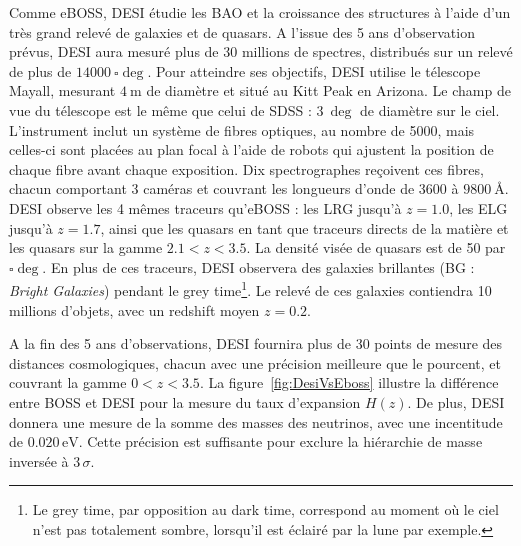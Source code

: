 Comme eBOSS, DESI étudie les BAO et la croissance des structures à l'aide d'un très grand relevé de galaxies et de quasars. A l'issue des 5 ans d'observation prévus, DESI aura mesuré plus de 30 millions de spectres, distribués sur un relevé de plus de $\SI{14000}{\square\deg}$.
Pour atteindre ses objectifs, DESI utilise le télescope Mayall, mesurant $\SI{4}{\meter}$ de diamètre et situé au Kitt Peak en Arizona. Le champ de vue du télescope est le même que celui de SDSS : $\SI{3}{\deg}$ de diamètre sur le ciel. L'instrument inclut un système de fibres optiques, au nombre de \num{5000}, mais celles-ci sont placées au plan focal à l'aide de robots qui ajustent la position de chaque fibre avant chaque exposition. Dix spectrographes reçoivent ces fibres, chacun comportant 3 caméras et couvrant les longueurs d'onde de \num{3600} à $\SI{9800}{\angstrom}$.
‌‌DESI observe les 4 mêmes traceurs qu'eBOSS : les LRG jusqu'à $z=\num{1,0}$, les ELG jusqu'à $z=\num{1,7}$, ainsi que les quasars en tant que traceurs directs de la matière et les quasars \lya{} sur la gamme $\num{2,1} < z < \num{3,5}$. La densité visée de quasars \lya{} est de \num{50} par $\si{\square\deg}$.
En plus de ces traceurs, DESI observera des galaxies brillantes (BG : \emph{Bright Galaxies}) pendant le grey time\footnote{Le grey time, par opposition au dark time, correspond au moment où le ciel n'est pas totalement sombre, lorsqu'il est éclairé par la lune par exemple.}. Le relevé de ces galaxies contiendra 10 millions d'objets, avec un redshift moyen $z=\num{0,2}$.

A la fin des 5 ans d'observations, DESI fournira plus de 30 points de mesure des distances cosmologiques, chacun avec une précision meilleure que le pourcent, et couvrant la gamme $\num{0}< z < \num{3.5}$. La figure~\ref{fig:DesiVsEboss} illustre la différence entre BOSS et DESI pour la mesure du taux d'expansion $H(z)$.
De plus, DESI donnera une mesure de la somme des masses des neutrinos, avec une incentitude de $\num{0,020}\,\mathrm{eV}$. Cette précision est suffisante pour exclure la hiérarchie de masse inversée à $3\,\sigma$.



